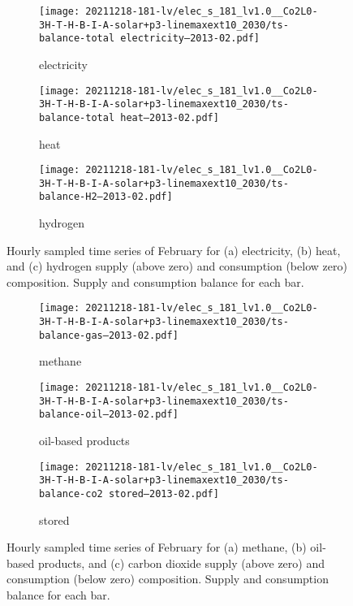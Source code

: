 \begin{figure}
    \centering
    \begin{subfigure}[t]{\textwidth}
        \centering
        \caption{electricity}
        \texttt{[image: 20211218-181-lv/elec\_s\_181\_lv1.0\_\_Co2L0-3H-T-H-B-I-A-solar+p3-linemaxext10\_2030/ts-balance-total electricity--2013-02.pdf]}
    \end{subfigure}
    \begin{subfigure}[t]{\textwidth}
        \centering
        \caption{heat}
        \texttt{[image: 20211218-181-lv/elec\_s\_181\_lv1.0\_\_Co2L0-3H-T-H-B-I-A-solar+p3-linemaxext10\_2030/ts-balance-total heat--2013-02.pdf]}
    \end{subfigure}
    \begin{subfigure}[t]{\textwidth}
        \centering
        \caption{hydrogen}
        \texttt{[image: 20211218-181-lv/elec\_s\_181\_lv1.0\_\_Co2L0-3H-T-H-B-I-A-solar+p3-linemaxext10\_2030/ts-balance-H2--2013-02.pdf]}
    \end{subfigure}
    \caption{Hourly sampled time series of February for (a) electricity, (b) heat, and (c) hydrogen supply (above zero) and consumption (below zero) composition. Supply and consumption balance for each bar.}
    \label{fig:output-ts-3}
\end{figure}

\begin{figure}
    \centering
    \begin{subfigure}[t]{\textwidth}
        \centering
        \caption{methane}
        \texttt{[image: 20211218-181-lv/elec\_s\_181\_lv1.0\_\_Co2L0-3H-T-H-B-I-A-solar+p3-linemaxext10\_2030/ts-balance-gas--2013-02.pdf]}
    \end{subfigure}
    \begin{subfigure}[t]{\textwidth}
        \centering
        \caption{oil-based products}
        \texttt{[image: 20211218-181-lv/elec\_s\_181\_lv1.0\_\_Co2L0-3H-T-H-B-I-A-solar+p3-linemaxext10\_2030/ts-balance-oil--2013-02.pdf]}
    \end{subfigure}
    \begin{subfigure}[t]{\textwidth}
        \centering
        \caption{stored \co}
        \texttt{[image: 20211218-181-lv/elec\_s\_181\_lv1.0\_\_Co2L0-3H-T-H-B-I-A-solar+p3-linemaxext10\_2030/ts-balance-co2 stored--2013-02.pdf]}
    \end{subfigure}
    \caption{Hourly sampled time series of February for (a) methane, (b) oil-based products, and (c) carbon dioxide supply (above zero) and consumption (below zero) composition. Supply and consumption balance for each bar.}
    \label{fig:output-ts-4}
\end{figure}

